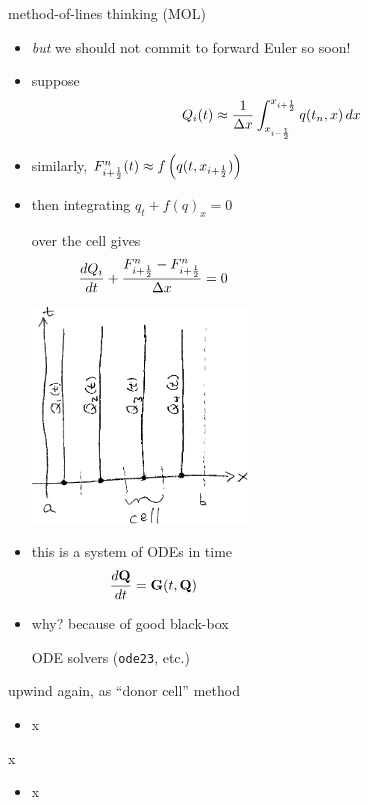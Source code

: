 \documentclass[10pt,hyperref]{beamer}
\newcommand{\bG}{\mathbf{G}}
\newcommand{\bQ}{\mathbf{Q}}
\begin{document}
\begin{frame}{method-of-lines thinking (MOL)}

\begin{itemize}
\item \emph{but} we should not commit to forward Euler so soon!
\item suppose
    $$Q_i(t) \approx \frac{1}{\Delta x} \int_{x_{i-\frac{1}{2}}}^{x_{i+\frac{1}{2}}} q(t_n,x)\,dx$$
\item similarly, ${F^n_{i+\frac{1}{2}}}(t) \approx f\left(q(t,{x_{i+\frac{1}{2}}})\right)$
\item then integrating $q_t + f(q)_x = 0$

over the cell gives
    $$\frac{dQ_i}{dt} + \frac{\Fiphalf-\Fiphalf}{\Delta x} = 0 \hspace{60mm}$$

\vspace{-30mm}
\hfill \includegraphics[width=0.45\textwidth]{figs/molsketch}

\vspace{-21mm}
\item this is a system of ODEs in time
    $$\frac{d\bQ}{dt} = \bG(t,\bQ) \hspace{60mm}$$

\item why? because of good black-box

ODE solvers (\texttt{ode23}, etc.)

\bigskip\bigskip
\end{itemize}
\end{frame}


\begin{frame}{upwind again, as ``donor cell'' method}

\begin{itemize}
\item x
\end{itemize}
\end{frame}


\begin{frame}{x}

\begin{itemize}
\item x
\end{itemize}
\end{frame}
\end{document}
